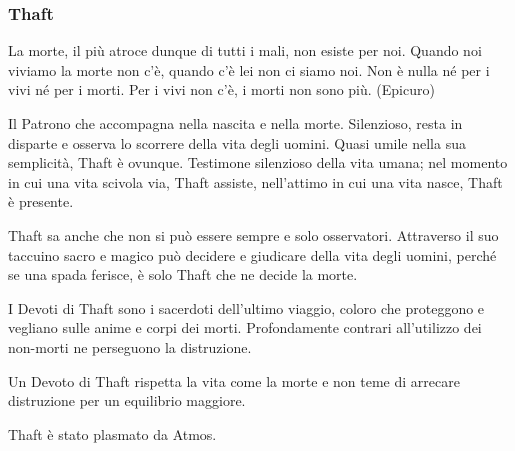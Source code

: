 \begin{multicols}{2}
\subsubsection{Thaft}\label{thaft}\hypertarget{thaft}{}

\begin{changemargin}{0.3cm}{0.3cm}\begin{enfasi}{
La morte, il più atroce dunque di tutti i mali, non esiste per noi. Quando noi viviamo la morte non c'è, quando c'è lei non ci siamo noi. Non è nulla né per i vivi né per i morti. Per i vivi non c'è, i morti non sono più. (Epicuro)
}\end{enfasi}\end{changemargin}\medskip

Il Patrono che accompagna nella nascita e nella morte. Silenzioso, resta in disparte e osserva lo scorrere della vita degli uomini. Quasi umile nella sua semplicità, Thaft è ovunque. Testimone silenzioso della vita umana; nel momento in cui una vita scivola via, Thaft assiste, nell'attimo in cui una vita nasce, Thaft è presente.

Thaft sa anche che non si può essere sempre e solo osservatori. Attraverso il suo taccuino sacro e magico può decidere e giudicare della vita degli uomini, perché se una spada ferisce, è solo Thaft che ne decide la morte.

I Devoti di Thaft sono i sacerdoti dell'ultimo viaggio, coloro che proteggono e vegliano sulle anime e corpi dei morti. Profondamente contrari all'utilizzo dei non-morti ne perseguono la distruzione.

Un Devoto di Thaft rispetta la vita come la morte e non teme di arrecare distruzione per un equilibrio maggiore.

Thaft è stato plasmato da Atmos.


\end{multicols}
